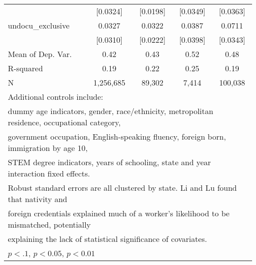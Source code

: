 \begin{table}[htbp]
\begin{tabular}{l*{4}{c}}
                    &    [0.0324]         &    [0.0198]         &    [0.0349]         &    [0.0363]         \\
\addlinespace
undocu\_exclusive    &      0.0327         &      0.0322         &      0.0387         &      0.0711\sym{**} \\
                    &    [0.0310]         &    [0.0222]         &    [0.0398]         &    [0.0343]         \\
\midrule
Mean of Dep. Var.   &        0.42         &        0.43         &        0.52         &        0.48         \\
R-squared           &        0.19         &        0.22         &        0.25         &        0.19         \\
N                   &   1,256,685         &      89,302         &       7,414         &     100,038         \\
\bottomrule
\multicolumn{5}{l}{\footnotesize Additional controls include:}\\
\multicolumn{5}{l}{\footnotesize dummy age indicators, gender, race/ethnicity, metropolitan residence, occupational category,}\\
\multicolumn{5}{l}{\footnotesize government occupation, English-speaking fluency, foreign born, immigration by age 10,}\\
\multicolumn{5}{l}{\footnotesize STEM degree indicators, years of schooling, state and year interaction fixed effects.}\\
\multicolumn{5}{l}{\footnotesize Robust standard errors are all clustered by state. Li and Lu found that nativity and}\\
\multicolumn{5}{l}{\footnotesize foreign credentials explained much of a worker's likelihood to be mismatched, potentially}\\
\multicolumn{5}{l}{\footnotesize explaining the lack of statistical significance of covariates.}\\
\multicolumn{5}{l}{\footnotesize \sym{*} \(p<.1\), \sym{**} \(p<0.05\), \sym{***} \(p<0.01\)}\\
\end{tabular}
\end{table}
